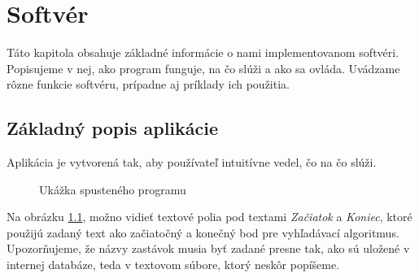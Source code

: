 \chapter{Softvér}
\label{kap:softver}

Táto kapitola obsahuje základné informácie o nami implementovanom softvéri. Popisujeme v nej, ako program funguje, na čo slúži a ako sa ovláda. Uvádzame rôzne funkcie softvéru, prípadne aj príklady ich použitia.


\section{Základný popis aplikácie}

Aplikácia je vytvorená tak, aby používateľ intuitívne vedel, čo na čo slúži.\newline

\begin{figure}[H]
  \caption{Ukážka spusteného programu}
  \label{ukazka_programu1}
\end{figure}

Na obrázku \ref{ukazka_programu1}, možno vidieť textové polia pod textami \textit{Začiatok} a \textit{Koniec}, ktoré použijú zadaný text ako začiatočný a konečný bod pre vyhľadávací algoritmus. Upozorňujeme, že názvy zastávok musia byť zadané presne tak, ako sú uložené v internej databáze, teda v textovom súbore, ktorý neskôr popíšeme.\newline

